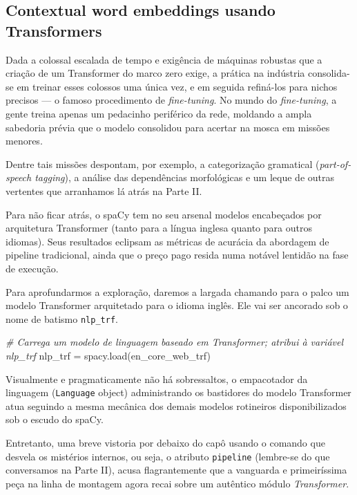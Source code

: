 \documentclass[
  brazilian,
]{article}
\newenvironment{Shaded}{}{}
\newcommand{\CommentTok}[1]{\textcolor[rgb]{0.38,0.63,0.69}{\textit{#1}}}
\newcommand{\NormalTok}[1]{#1}
\newcommand{\OperatorTok}[1]{\textcolor[rgb]{0.40,0.40,0.40}{#1}}
\newcommand{\StringTok}[1]{\textcolor[rgb]{0.25,0.44,0.63}{#1}}
\begin{document}
\hypertarget{contextual-word-embeddings-usando-transformers}{%
\subsection{Contextual word embeddings usando
Transformers}\label{contextual-word-embeddings-usando-transformers}}

Dada a colossal escalada de tempo e exigência de máquinas robustas que a
criação de um Transformer do marco zero exige, a prática na indústria
consolida-se em treinar esses colossos uma única vez, e em seguida
refiná-los para nichos precisos --- o famoso procedimento de
\emph{fine-tuning}. No mundo do \emph{fine-tuning}, a gente treina
apenas um pedacinho periférico da rede, moldando a ampla sabedoria
prévia que o modelo consolidou para acertar na mosca em missões menores.

Dentre tais missões despontam, por exemplo, a categorização gramatical
(\emph{part-of-speech tagging}), a análise das dependências morfológicas
e um leque de outras vertentes que arranhamos lá atrás na Parte II.

Para não ficar atrás, o spaCy tem no seu arsenal modelos encabeçados por
arquitetura Transformer (tanto para a língua inglesa quanto para outros
idiomas). Seus resultados eclipsam as métricas de acurácia da abordagem
de pipeline tradicional, ainda que o preço pago resida numa notável
lentidão na fase de execução.

Para aprofundarmos a exploração, daremos a largada chamando para o palco
um modelo Transformer arquitetado para o idioma inglês. Ele vai ser
ancorado sob o nome de batismo \texttt{nlp\_trf}.

\begin{Shaded}
\begin{Highlighting}[]
\CommentTok{\# Carrega um modelo de linguagem baseado em Transformer; atribui à variável \textquotesingle{}nlp\_trf\textquotesingle{}}
\NormalTok{nlp\_trf }\OperatorTok{=}\NormalTok{ spacy.load(}\StringTok{\textquotesingle{}en\_core\_web\_trf\textquotesingle{}}\NormalTok{)}
\end{Highlighting}
\end{Shaded}

Visualmente e pragmaticamente não há sobressaltos, o empacotador da
linguagem (\texttt{Language} object) administrando os bastidores do
modelo Transformer atua seguindo a mesma mecânica dos demais modelos
rotineiros disponibilizados sob o escudo do spaCy.

Entretanto, uma breve vistoria por debaixo do capô usando o comando que
desvela os mistérios internos, ou seja, o atributo \texttt{pipeline}
(lembre-se do que conversamos na Parte II), acusa flagrantemente que a
vanguarda e primeiríssima peça na linha de montagem agora recai sobre um
autêntico módulo \emph{Transformer}.
\end{document}
